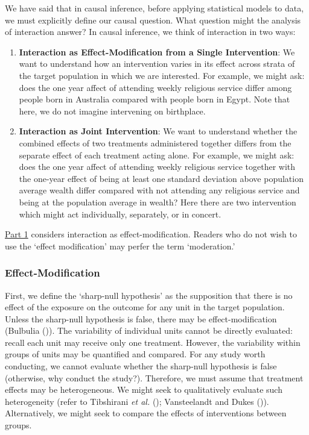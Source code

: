 \documentclass[
  single column]{article}
\begin{document}
We have said that in causal inference, before applying statistical
models to data, we must explicitly define our causal question. What
question might the analysis of interaction answer? In causal inference,
we think of interaction in two ways:

\begin{enumerate}
\def\labelenumi{\arabic{enumi}.}
\item
  \textbf{Interaction as Effect-Modification from a Single
  Intervention}: We want to understand how an intervention varies in its
  effect across strata of the target population in which we are
  interested. For example, we might ask: does the one year affect of
  attending weekly religious service differ among people born in
  Australia compared with people born in Egypt. Note that here, we do
  not imagine intervening on birthplace.
\item
  \textbf{Interaction as Joint Intervention}: We want to understand
  whether the combined effects of two treatments administered together
  differs from the separate effect of each treatment acting alone. For
  example, we might ask: does the one year affect of attending weekly
  religious service together with the one-year effect of being at least
  one standard deviation above population average wealth differ compared
  with not attending any religious service and being at the population
  average in wealth? Here there are two intervention which might act
  individually, separately, or in concert.
\end{enumerate}

\hyperref[id-sec-1]{Part 1} considers interaction as
effect-modification. Readers who do not wish to use the `effect
modification' may perfer the term `moderation.'

\subsubsection{Effect-Modification}\label{effect-modification}

First, we define the `sharp-null hypothesis' as the supposition that
there is no effect of the exposure on the outcome for any unit in the
target population. Unless the sharp-null hypothesis is false, there may
be effect-modification (Bulbulia
()). The variability of
individual units cannot be directly evaluated: recall each unit may
receive only one treatment. However, the variability within groups of
units may be quantified and compared. For any study worth conducting, we
cannot evaluate whether the sharp-null hypothesis is false (otherwise,
why conduct the study?). Therefore, we must assume that treatment
effects may be heterogeneous. We might seek to qualitatively evaluate
such heterogeneity (refer to Tibshirani \emph{et al.}
(); Vansteelandt and Dukes
()). Alternatively, we might seek
to compare the effects of interventions between groups.
\end{document}
